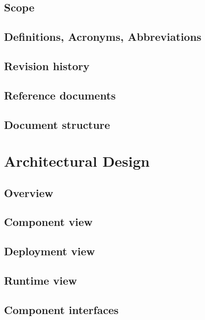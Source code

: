 \documentclass[a4paper,oneside,11pt]{article}
\begin{document}
        \subsection{Scope}
            
        \subsection{Definitions, Acronyms, Abbreviations}
            
        \subsection{Revision history}
        \subsection{Reference documents}
            
        \subsection{Document structure}
        
    
    \newpage
    \section{Architectural Design}
        \subsection{Overview}
            
        \subsection{Component view}
            
        \subsection{Deployment view}
            
        \subsection{Runtime view}
            
        \subsection{Component interfaces}
            
\end{document}
